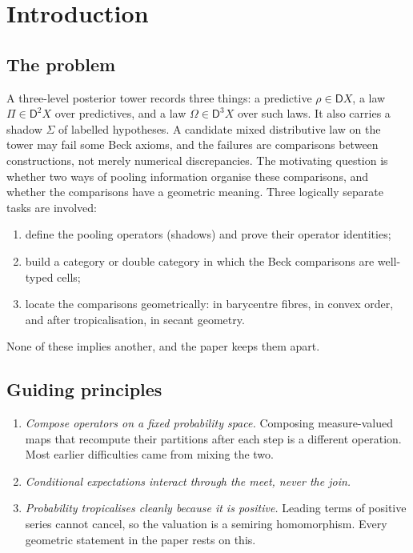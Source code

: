 \documentclass[11pt]{article}
\theoremstyle{definition}
\newcommand{\D}{\mathsf D}
\begin{document}
\tableofcontents

\section{Introduction}

\subsection{The problem}
A three-level posterior tower records three things: a predictive $\rho\in\D X$, a law $\Pi\in\D^2X$ over predictives, and a law
$\Omega\in\D^3X$ over such laws. It also carries a shadow $\Sigma$ of labelled hypotheses. A candidate mixed distributive law on the
tower may fail some Beck axioms, and the failures are comparisons between constructions, not merely numerical discrepancies. The
motivating question is whether two ways of pooling information organise these comparisons, and whether the comparisons have a geometric
meaning. Three logically separate tasks are involved:
\begin{enumerate}[label=(\arabic*)]
\item define the pooling operators (shadows) and prove their operator identities;
\item build a category or double category in which the Beck comparisons are well-typed cells;
\item locate the comparisons geometrically: in barycentre fibres, in convex order, and after tropicalisation, in secant geometry.
\end{enumerate}
None of these implies another, and the paper keeps them apart.

\subsection{Guiding principles}
\begin{enumerate}[label=(\roman*)]
\item \emph{Compose operators on a fixed probability space.} Composing measure-valued maps that recompute their partitions after each
  step is a different operation. Most earlier difficulties came from mixing the two.
\item \emph{Conditional expectations interact through the meet, never the join.}
\item \emph{Probability tropicalises cleanly because it is positive.} Leading terms of positive series cannot cancel, so the
  valuation is a semiring homomorphism. Every geometric statement in the paper rests on this.
\end{enumerate}
\end{document}

